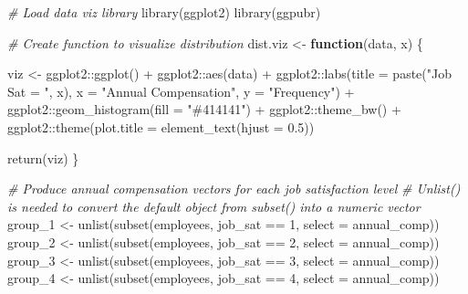\documentclass[
]{book}
\newenvironment{Shaded}{\begin{snugshade}}{\end{snugshade}}
\newcommand{\AttributeTok}[1]{\textcolor[rgb]{0.77,0.63,0.00}{#1}}
\newcommand{\CommentTok}[1]{\textcolor[rgb]{0.56,0.35,0.01}{\textit{#1}}}
\newcommand{\ControlFlowTok}[1]{\textcolor[rgb]{0.13,0.29,0.53}{\textbf{#1}}}
\newcommand{\DecValTok}[1]{\textcolor[rgb]{0.00,0.00,0.81}{#1}}
\newcommand{\FloatTok}[1]{\textcolor[rgb]{0.00,0.00,0.81}{#1}}
\newcommand{\FunctionTok}[1]{\textcolor[rgb]{0.00,0.00,0.00}{#1}}
\newcommand{\NormalTok}[1]{#1}
\newcommand{\OtherTok}[1]{\textcolor[rgb]{0.56,0.35,0.01}{#1}}
\newcommand{\SpecialCharTok}[1]{\textcolor[rgb]{0.00,0.00,0.00}{#1}}
\newcommand{\StringTok}[1]{\textcolor[rgb]{0.31,0.60,0.02}{#1}}
\begin{document}
\begin{Shaded}
\begin{Highlighting}[]
\CommentTok{\# Load data viz library}
\FunctionTok{library}\NormalTok{(ggplot2)}
\FunctionTok{library}\NormalTok{(ggpubr)}

\CommentTok{\# Create function to visualize distribution}
\NormalTok{dist.viz }\OtherTok{\textless{}{-}} \ControlFlowTok{function}\NormalTok{(data, x) \{}
  
\NormalTok{viz }\OtherTok{\textless{}{-}}\NormalTok{ ggplot2}\SpecialCharTok{::}\FunctionTok{ggplot}\NormalTok{() }\SpecialCharTok{+} 
\NormalTok{       ggplot2}\SpecialCharTok{::}\FunctionTok{aes}\NormalTok{(data) }\SpecialCharTok{+} 
\NormalTok{       ggplot2}\SpecialCharTok{::}\FunctionTok{labs}\NormalTok{(}\AttributeTok{title =} \FunctionTok{paste}\NormalTok{(}\StringTok{"Job Sat = "}\NormalTok{, x), }\AttributeTok{x =} \StringTok{"Annual Compensation"}\NormalTok{, }\AttributeTok{y =} \StringTok{"Frequency"}\NormalTok{) }\SpecialCharTok{+} 
\NormalTok{       ggplot2}\SpecialCharTok{::}\FunctionTok{geom\_histogram}\NormalTok{(}\AttributeTok{fill =} \StringTok{"\#414141"}\NormalTok{) }\SpecialCharTok{+}
\NormalTok{       ggplot2}\SpecialCharTok{::}\FunctionTok{theme\_bw}\NormalTok{() }\SpecialCharTok{+}
\NormalTok{       ggplot2}\SpecialCharTok{::}\FunctionTok{theme}\NormalTok{(}\AttributeTok{plot.title =} \FunctionTok{element\_text}\NormalTok{(}\AttributeTok{hjust =} \FloatTok{0.5}\NormalTok{))}

  \FunctionTok{return}\NormalTok{(viz)}
\NormalTok{\}}

\CommentTok{\# Produce annual compensation vectors for each job satisfaction level}
\CommentTok{\# Unlist() is needed to convert the default object from subset() into a numeric vector}
\NormalTok{group\_1 }\OtherTok{\textless{}{-}} \FunctionTok{unlist}\NormalTok{(}\FunctionTok{subset}\NormalTok{(employees, job\_sat }\SpecialCharTok{==} \DecValTok{1}\NormalTok{, }\AttributeTok{select =}\NormalTok{ annual\_comp))}
\NormalTok{group\_2 }\OtherTok{\textless{}{-}} \FunctionTok{unlist}\NormalTok{(}\FunctionTok{subset}\NormalTok{(employees, job\_sat }\SpecialCharTok{==} \DecValTok{2}\NormalTok{, }\AttributeTok{select =}\NormalTok{ annual\_comp))}
\NormalTok{group\_3 }\OtherTok{\textless{}{-}} \FunctionTok{unlist}\NormalTok{(}\FunctionTok{subset}\NormalTok{(employees, job\_sat }\SpecialCharTok{==} \DecValTok{3}\NormalTok{, }\AttributeTok{select =}\NormalTok{ annual\_comp))}
\NormalTok{group\_4 }\OtherTok{\textless{}{-}} \FunctionTok{unlist}\NormalTok{(}\FunctionTok{subset}\NormalTok{(employees, job\_sat }\SpecialCharTok{==} \DecValTok{4}\NormalTok{, }\AttributeTok{select =}\NormalTok{ annual\_comp))}


\end{Highlighting}
\end{Shaded}
\end{document}
